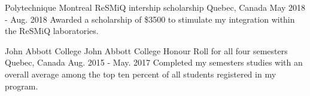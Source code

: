\begin{cventries}
\cventry
    {Polytechnique Montreal}
    {ReSMiQ intership scholarship}
    {Quebec, Canada}
    {May 2018 - Aug. 2018}
    {
      {Awarded a scholarship of \$3500 to stimulate my integration within the  ReSMiQ laboratories.}  
    }    \newline

  \cventry
    {John Abbott College}
    {John Abbott College Honour Roll for all four semesters}
    {Quebec, Canada}
    {Aug. 2015 - May. 2017}
    {
      {Completed my semesters
studies with an overall average among the top
ten percent of all students registered in my
program.}  
    }    \newline

\end{cventries}